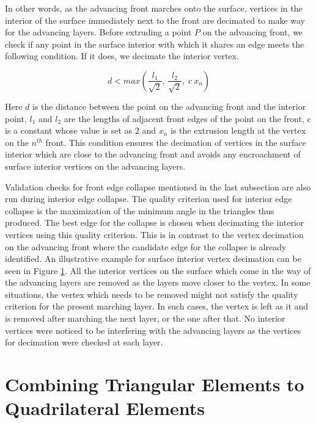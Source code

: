 \begin{figure}[hbt!]
	\label{interior-vert-collapse}
\end{figure}

In other words, as the advancing front marches onto the surface, vertices in the interior of the surface immediately next to the front are decimated to make way for the advancing layers. Before extruding a point $P$ on the advancing front, we check if any point in the surface interior with which it shares an edge meets the following condition. If it does, we decimate the interior vertex.

\begin{equation}
d < max \left( \frac{l_{1}}{\sqrt{2}}, \, \frac{l_{2}}{\sqrt{2}}, \; c \:\mathit{x_n}\right)
\label{collapse-eq}
\end{equation}

Here $d$ is the distance between the point on the advancing front and the interior point, $l_1$ and $l_2$ are the lengths of adjacent front edges of the point on the front, c is a constant whose value is set as $2$ and $x_n$ is the extrusion length at the vertex on the $n^{th}$ front. This condition ensures the decimation of vertices in the surface interior which are close to the advancing front and avoids any encroachment of surface interior vertices on the advancing layers. 

Validation checks for front edge collapse mentioned in the last subsection are also run during interior edge collapse. The quality criterion used for interior edge collapse is the maximization of the minimum angle in the triangles thus produced. The best edge for the collapse is chosen when decimating the interior vertices using this quality criterion. This is in contrast to the vertex decimation on the advancing front where the candidate edge for the collapse is already identified. An illustrative example for surface interior vertex decimation can be seen in Figure \ref{interior-vert-collapse}. All the interior vertices on the surface which come in the way of the advancing layers are removed as the layers move closer to the vertex. In some situations, the vertex which needs to be removed might not satisfy the quality criterion for the present marching layer. In such cases, the vertex is left as it and is removed after marching the next layer, or the one after that. No interior vertices were noticed to be interfering with the advancing layers as the vertices for decimation were checked at each layer.

\section{Combining Triangular Elements to Quadrilateral Elements}

